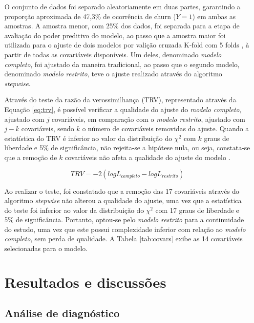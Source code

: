 \documentclass[twocolumn]{rbef}
\newcommand{\1}{\mathbbm{1}}
\begin{document}
O conjunto de dados foi separado aleatoriamente em duas partes, garantindo a proporção aproximada de 47,3\% de ocorrência de churn (\(Y=1\)) em ambas as amostras. A amostra menor, com 25\% dos dados, foi separada para a etapa de avaliação do poder preditivo do modelo, ao passo que a amostra maior foi utilizada para o ajuste de dois modelos por valição cruzada K-fold com 5 folds \cite{Kohavi1995}, à partir de todas as covariáveis disponíveis. Um deles, denominado \textit{modelo completo}, foi ajustado da maneira tradicional, ao passo que o segundo modelo, denominado \textit{modelo restrito}, teve o ajuste realizado através do algoritmo \textit{stepwise}.

Através do teste da razão da verossimilhança (TRV), representado através da Equação \eqref{eq:trv}, é possível verificar a qualidade do ajuste do \textit{modelo completo}, ajustado com \(j\) covariáveis, em comparação com o \textit{modelo restrito}, ajustado com \(j-k\) covariáveis, sendo \(k\) o número de covariáveis removidas do ajuste. Quando a estatística do TRV é inferior ao valor da distribuição do \({\chi}^2\) com \(k\) graus de liberdade e 5\% de significância, não rejeita-se a hipótese nula, ou seja, constata-se que a remoção de \(k\) covariáveis não afeta a qualidade do ajuste do modelo \cite{Favero2017}.

\begin{equation}
TRV = -2(logL_{completo} - logL_{restrito})\label{eq:trv}
\end{equation}

Ao realizar o teste, foi constatado que a remoção das 17 covariáveis através do algoritmo \textit{stepwise} não alterou a qualidade do ajuste, uma vez que a estatística do teste foi inferior ao valor da distribuição do \({\chi}^2\) com 17 graus de liberdade e 5\% de significância. Portanto, optou-se pelo \textit{modelo restrito} para a continuidade do estudo, uma vez que este possui complexidade inferior com relação ao \textit{modelo completo}, sem perda de qualidade. A Tabela \ref{tab:covars} exibe as 14 covariáveis selecionadas para o modelo.

\hypertarget{resultados-e-discussuxf5es}{%
\section{Resultados e discussões}\label{resultados-e-discussuxf5es}}

\hypertarget{anuxe1lise-de-diagnuxf3stico}{%
\subsection{Análise de diagnóstico}\label{anuxe1lise-de-diagnuxf3stico}}
\end{document}
